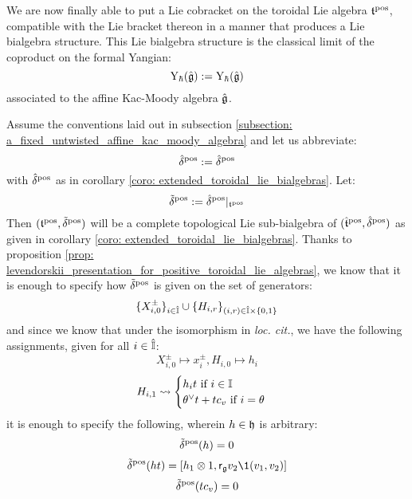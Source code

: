         We are now finally able to put a Lie cobracket on the toroidal Lie algebra $\mathfrak{t}^{\mathrm{pos}}$, compatible with the Lie bracket thereon in a manner that produces a Lie bialgebra structure. This Lie bialgebra structure is the classical limit of the coproduct on the formal Yangian:
            $$\mathrm{Y}_{\hbar}(\hat{\mathfrak{g}}) := \mathrm{Y}_{\hbar}(\hat{\mathfrak{g}})$$
        associated to the affine Kac-Moody algebra $\hat{\mathfrak{g}}$. 
        \begin{theorem} \label{theorem: toroidal_lie_bialgebras}
            Assume the conventions laid out in subsection \ref{subsection: a_fixed_untwisted_affine_kac_moody_algebra} and let us abbreviate:
                $$\hat{\delta}^{\mathrm{pos}} := \hat{\delta}^{\mathrm{pos}}$$
            with $\hat{\delta}^{\mathrm{pos}}$ as in corollary \ref{coro: extended_toroidal_lie_bialgebras}. Let:
                $$\tilde{\delta}^{\mathrm{pos}} := \hat{\delta}^{\mathrm{pos}}|_{\mathfrak{t}^{\mathrm{pos}}}$$
            Then $(\mathfrak{t}^{\mathrm{pos}}, \tilde{\delta}^{\mathrm{pos}})$ will be a complete topological Lie sub-bialgebra of $(\hat{\mathfrak{t}}^{\mathrm{pos}}, \hat{\delta}^{\mathrm{pos}})$ as given in corollary \ref{coro: extended_toroidal_lie_bialgebras}. Thanks to proposition \ref{prop: levendorskii_presentation_for_positive_toroidal_lie_algebras}, we know that it is enough to specify how $\tilde{\delta}^{\mathrm{pos}}$ is given on the set of generators:
                $$\{X_{i, 0}^{\pm}\}_{i \in \hat{\simpleroots}} \cup \{H_{i, r}\}_{ (i, r) \in \hat{\simpleroots} \x \{0, 1\} }$$
            and since we know that under the isomorphism in \textit{loc. cit.}, we have the following assignments, given for all $i \in \hat{\mathbb{I}}$:
                $$X_{i, 0}^{\pm} \mapsto x_i^{\pm}, H_{i, 0} \mapsto h_i$$
                $$
                    H_{i, 1} \leadsto
                    \begin{cases}
                        \text{$h_i t$ if $i \in \mathbb{I}$}
                        \\
                        \text{$\theta^{\vee} t + t c_v$ if $i = \theta$}
                    \end{cases}
                $$
            it is enough to specify the following, wherein $h \in \mathfrak{h}$ is arbitrary:
                $$\tilde{\delta}^{\mathrm{pos}}(h) = 0$$
                $$\tilde{\delta}^{\positive}(ht) = [h_1 \tensor 1, \sfr_{\g} v_2 \1(v_1, v_2)]$$
                $$\tilde{\delta}^{\mathrm{pos}}(t c_v) = 0$$
        \end{theorem}
